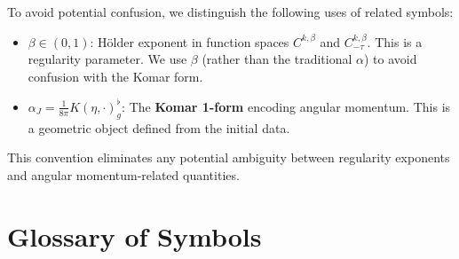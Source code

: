\begin{remark}\label{rem:notation-disambiguation}
To avoid potential confusion, we distinguish the following uses of related symbols:
\begin{itemize}
    \item $\beta \in (0,1)$: H\"older exponent in function spaces $C^{k,\beta}$ and $C^{k,\beta}_{-\tau}$. This is a regularity parameter. We use $\beta$ (rather than the traditional $\alpha$) to avoid confusion with the Komar form.
    \item $\alpha_J = \frac{1}{8\pi}K(\eta, \cdot)^\flat_g$: The \textbf{Komar 1-form} encoding angular momentum. This is a geometric object defined from the initial data.
\end{itemize}
This convention eliminates any potential ambiguity between regularity exponents and angular momentum-related quantities.
\end{remark}

\section*{Glossary of Symbols}
\label{sec:glossary}

